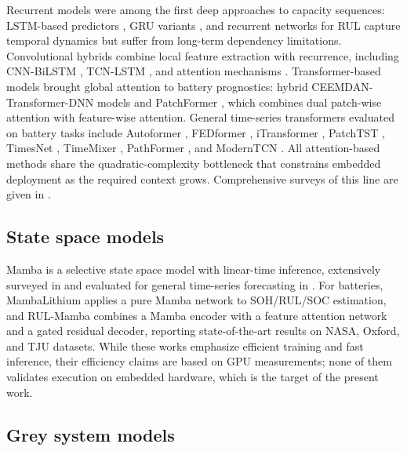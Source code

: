 \documentclass[final,5p,times,twocolumn]{elsarticle}
\begin{document}
Recurrent models were among the first deep approaches to capacity sequences:
LSTM-based predictors \cite{ref_lstm_rul_zhang,ref_lstm_elman_li},
GRU variants \cite{ref_gru_rnn}, and recurrent networks
for RUL \cite{ref_rnn_catelani} capture temporal dynamics but suffer
from long-term dependency limitations. Convolutional hybrids combine
local feature extraction with recurrence, including CNN-BiLSTM
\cite{ref_cnn_bilstm}, TCN-LSTM \cite{ref_tcn_lstm}, and attention
mechanisms \cite{ref_lstm_transformer}. Transformer-based models
\cite{ref_vaswani} brought global attention to battery prognostics:
hybrid CEEMDAN-Transformer-DNN models \cite{ref_ceemdan_trans} and
PatchFormer \cite{ref_patchformer}, which combines dual patch-wise
attention with feature-wise attention. General time-series
transformers evaluated on battery tasks include Autoformer
\cite{ref_autoformer}, FEDformer \cite{ref_fedformer}, iTransformer
\cite{ref_itransformer}, PatchTST \cite{ref_patchtst}, TimesNet
\cite{ref_timesnet}, TimeMixer \cite{ref_timemixer}, PathFormer
\cite{ref_pathformer}, and ModernTCN \cite{ref_moderntcn}. All
attention-based methods share the quadratic-complexity bottleneck
that constrains embedded deployment as the required context grows.
Comprehensive surveys of this
line are given in \cite{ref_lipu_review,ref_he_review}.

\subsection{State space models}

Mamba \cite{ref_mamba} is a selective state space model with
linear-time inference, extensively surveyed in \cite{ref_mamba_survey}
and evaluated for general time-series forecasting in
\cite{ref_samamba_tsf}. For batteries, MambaLithium \cite{ref_mambalithium}
applies a pure Mamba network to SOH/RUL/SOC estimation, and RUL-Mamba
\cite{ref_rulmamba} combines a Mamba encoder with a feature attention
network and a gated residual decoder, reporting state-of-the-art
results on NASA, Oxford, and TJU datasets. While these works emphasize
efficient training and fast inference, their efficiency claims are
based on GPU measurements; none of them validates execution on
embedded hardware, which is the target of the present work.

\subsection{Grey system models}
\end{document}
